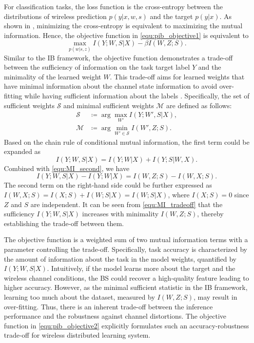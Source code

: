 \documentclass[lettersize,journal]{IEEEtran}
\theoremstyle{definition}
\theoremstyle{plain}
\begin{document}
For classification tasks, the loss function is the cross-entropy between the distributions of wireless prediction $p(y|x,w,s)$ and the target $p(y|x)$. As shown in \cite{CE-MI}, minimizing the cross-entropy is equivalent to maximizing the mutual information. Hence, the objective function in \cref{equ:pib_objective1} is equivalent to 
\begin{equation}
    \label{equ:pib_objective2}
    \max_{p(w|s,z)} I(Y;W,S|X) - \beta I(W,Z;S).
\end{equation}
Similar to the IB framework, the objective function demonstrates a trade-off between the sufficiency of information on the task target label $Y$ and the minimality of the learned weight $W$.
This trade-off aims for learned weights that have minimal information about the channel state information to avoid over-fitting while having sufficient information about the labels \cite{minimal-sufficient}. Specifically, the set of sufficient weights $\mathcal{S}$ and minimal sufficient weights $\mathcal{M}$ are defined as follows:
\begin{equation}
    \label{equ:minimal-sufficient}
    \begin{split}
        \mathcal{S} & \coloneqq \arg\max_{W'} I(Y;W',S|X),\\
        \mathcal{M} & \coloneqq\arg \min_{W'\in\mathcal{S}}I(W',Z;S).
    \end{split}
\end{equation}
Based on the chain rule of conditional mutual information, the first term could be expanded as
\begin{equation}
    I(Y;W,S|X) = I(Y;W|X) + I(Y;S|W,X).
\end{equation}
Combined with \cref{equ:MI_second}, we have
\begin{equation}
    \label{equ:MI_tradeoff}
    I(Y;W,S|X) - I(Y;W|X) = I(W,Z;S) - I(W,X;S).
\end{equation}
The second term on the right-hand side could be further expressed as $I(W,X;S) = I(X;S) + I(W;S|X)=I(W;S|X)$, where $I(X;S)=0$ since $Z$ and $S$ are independent. It can be seen from \cref{equ:MI_tradeoff} that the sufficiency $I(Y;W,S|X)$ increases with minimality $I(W,Z;S)$, thereby establishing the trade-off between them.

The objective function is a weighted sum of two mutual information terms with a parameter controlling the trade-off. Specifically, task accuracy is characterized by the amount of information about the task in the model weights, quantified by $I(Y;W,S|X)$. Intuitively, if the model learns more about the target and the wireless channel conditions, the BS could recover a high-quality feature leading to higher accuracy. However, as the minimal sufficient statistic in the IB framework, learning too much about the dataset, measured by $I(W,Z;S)$, may result in over-fitting. Thus, there is an inherent trade-off between the inference performance and the robustness against channel distortions. The objective function in \cref{equ:pib_objective2} explicitly formulates such an accuracy-robustness trade-off for wireless distributed learning system.
\end{document}
